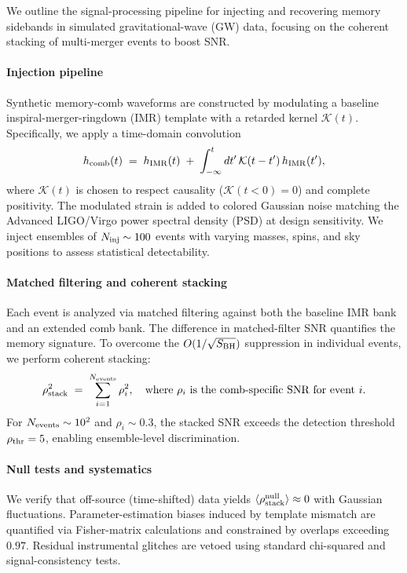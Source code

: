 \documentclass[a4paper,11pt]{article}
\theoremstyle{plain}
\theoremstyle{definition}
\theoremstyle{remark}
\begin{document}
We outline the signal-processing pipeline for injecting and recovering memory sidebands in simulated gravitational-wave (GW) data, focusing on the coherent stacking of multi-merger events to boost SNR.

\paragraph{Injection pipeline}
Synthetic memory-comb waveforms are constructed by modulating a baseline inspiral-merger-ringdown (IMR) template with a retarded kernel $\mathcal{K}(t)$. Specifically, we apply a time-domain convolution
\begin{equation}
h_{\rm comb}(t)\;=\;h_{\rm IMR}(t)\;+\;\int_{-\infty}^t dt'\,\mathcal{K}(t-t')\,h_{\rm IMR}(t'),
\end{equation}
where $\mathcal{K}(t)$ is chosen to respect causality ($\mathcal{K}(t<0)=0$) and complete positivity. The modulated strain is added to colored Gaussian noise matching the Advanced LIGO/Virgo power spectral density (PSD) at design sensitivity. We inject ensembles of $N_{\rm inj}\sim 100$ events with varying masses, spins, and sky positions to assess statistical detectability.

\paragraph{Matched filtering and coherent stacking}
Each event is analyzed via matched filtering against both the baseline IMR bank and an extended comb bank. The difference in matched-filter SNR quantifies the memory signature. To overcome the $O(1/\sqrt{S_{\rm BH}})$ suppression in individual events, we perform coherent stacking:
\begin{equation}
\rho_{\rm stack}^2\;=\;\sum_{i=1}^{N_{\rm events}}\rho_i^2,
\quad \text{where } \rho_i \text{ is the comb-specific SNR for event } i.
\end{equation}
For $N_{\rm events}\sim 10^2$ and $\rho_i \sim 0.3$, the stacked SNR exceeds the detection threshold $\rho_{\rm thr}=5$, enabling ensemble-level discrimination.

\paragraph{Null tests and systematics}
We verify that off-source (time-shifted) data yields $\langle \rho_{\rm stack}^{\rm null}\rangle \approx 0$ with Gaussian fluctuations. Parameter-estimation biases induced by template mismatch are quantified via Fisher-matrix calculations and constrained by overlaps exceeding $0.97$. Residual instrumental glitches are vetoed using standard chi-squared and signal-consistency tests.
\end{document}
